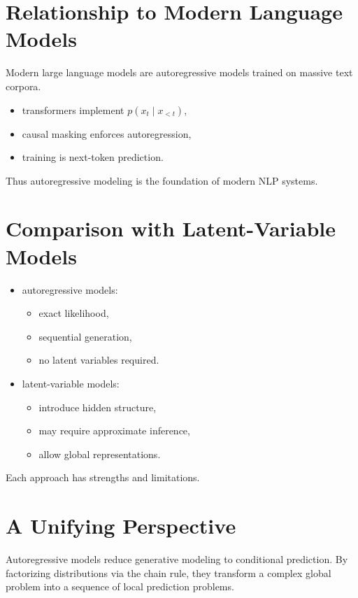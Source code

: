 \section{Relationship to Modern Language Models}

Modern large language models are autoregressive models trained on massive text corpora.

\begin{itemize}
    \item transformers implement $p(x_t \mid x_{<t})$,
    \item causal masking enforces autoregression,
    \item training is next-token prediction.
\end{itemize}

Thus autoregressive modeling is the foundation of modern NLP systems.

\section{Comparison with Latent-Variable Models}

\begin{itemize}
    \item autoregressive models:
    \begin{itemize}
        \item exact likelihood,
        \item sequential generation,
        \item no latent variables required.
    \end{itemize}
    \item latent-variable models:
    \begin{itemize}
        \item introduce hidden structure,
        \item may require approximate inference,
        \item allow global representations.
    \end{itemize}
\end{itemize}

Each approach has strengths and limitations.

\section{A Unifying Perspective}

Autoregressive models reduce generative modeling to conditional prediction. By factorizing distributions via the chain rule, they transform a complex global problem into a sequence of local prediction problems.

